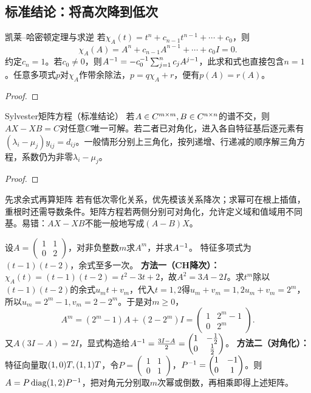 \subsection{标准结论：将高次降到低次}
\begin{theorem}{凯莱--哈密顿定理与求逆}
若$\chi_A(t)=t^n+c_{n-1}t^{n-1}+\cdots+c_0$，则
\begin{equation}\chi_A(A)=A^n+c_{n-1}A^{n-1}+\cdots+c_0I=0.\label{eq:CH}\end{equation}
约定$c_n=1$。若$c_0\ne0$，则$A^{-1}=-c_0^{-1}\sum_{j=1}^n c_j A^{j-1}$，此求和式也直接包含$n=1$。任意多项式$p$对$\chi_A$作带余除法，$p=q\chi_A+r$，便有$p(A)=r(A)$。
\end{theorem}
\begin{proof}

\end{proof}
\begin{theorem}{Sylvester矩阵方程（标准结论）}
若$A\in C^{m\times m},B\in C^{n\times n}$的谱不交，则$AX-XB=C$对任意$C$唯一可解。若二者已对角化，进入各自特征基后逐元素有$(\lambda_i-\mu_j)y_{ij}=d_{ij}$。一般情形分别上三角化，按列递增、行递减的顺序解三角方程，系数仍为非零$\lambda_i-\mu_j$。
\end{theorem}
\begin{proof}

\end{proof}
\begin{method}{先求余式再算矩阵}
若有低次零化关系，优先模该关系降次；求幂可在根上插值，重根时还需导数条件。矩阵方程若两侧分别可对角化，允许定义域和值域用不同基。易错：$AX-XB$不能一般地写成$(A-B)X$。
\end{method}
{设$A=\begin{pmatrix}1&1\\0&2\end{pmatrix}$，对非负整数$m$求$A^m$，并求$A^{-1}$。}
{特征多项式为$(t-1)(t-2)$，余式至多一次。}
{\textbf{方法一（CH降次）：}$\chi_A(t)=(t-1)(t-2)=t^2-3t+2$，故$A^2=3A-2I$。求$t^m$除以$(t-1)(t-2)$的余式$u_mt+v_m$，代入$t=1,2$得$u_m+v_m=1,2u_m+v_m=2^m$，所以$u_m=2^m-1,v_m=2-2^m$。于是对$m\ge0$，
\[A^m=(2^m-1)A+(2-2^m)I=\begin{pmatrix}1&2^m-1\\0&2^m\end{pmatrix}.\]
又$A(3I-A)=2I$，显式构造给$A^{-1}=\frac{3I-A}{2}=\begin{pmatrix}1&-\frac{1}{2}\\0&\frac{1}{2}\end{pmatrix}$。
\textbf{方法二（对角化）：}特征向量取$(1,0)T,(1,1)T$，令$P=\begin{pmatrix}1&1\\0&1\end{pmatrix}$，$P^{-1}=\begin{pmatrix}1&-1\\0&1\end{pmatrix}$。则$A=P\operatorname{diag}(1,2)P^{-1}$，把对角元分别取$m$次幂或倒数，再相乘即得上述矩阵。}
